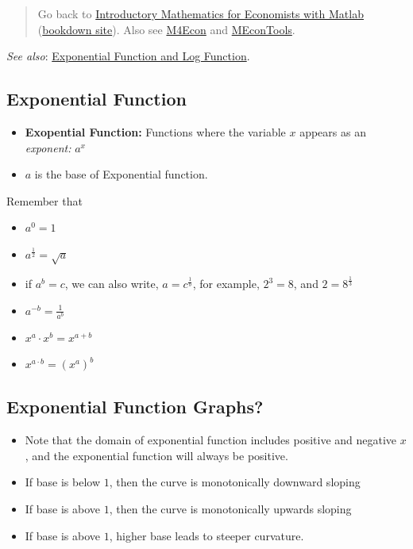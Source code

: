 \documentclass[
]{book}
\begin{document}
\begin{quote}
Go back to \href{https://math4econ.github.io/}{Introductory Mathematics for Economists with Matlab} (\href{https://math4econ.github.io/bookdown}{bookdown site}). Also see \href{http://fanwangecon.github.io/M4Econ}{M4Econ} and \href{https://fanwangecon.github.io/MEconTools/}{MEconTools}.
\end{quote}

\emph{See also}: \href{https://math4econ.github.io/explog/exolog.html}{Exponential Function and Log
Function}.

\hypertarget{exponential-function}{%
\subsection{\texorpdfstring{\textbf{Exponential Function}}{Exponential Function}}\label{exponential-function}}

\begin{itemize}
\item
  \textbf{Exopential Function:} Functions where the variable \(x\) appears as
  an \emph{exponent:} \(a^x\)
\item
  \(a\) is the base of Exponential function.
\end{itemize}

Remember that

\begin{itemize}
\item
  \(\displaystyle a^0 =1\)
\item
  \(\displaystyle a^{\frac{1}{2}} =\sqrt{a}\)
\item
  if \(a^b =c\), we can also write, \(a=c^{\frac{1}{b}}\), for example,
  \(2^3 =8\), and \(2=8^{\frac{1}{3}}\)
\item
  \(\displaystyle a^{-b} =\frac{1}{a^b }\)
\item
  \(\displaystyle x^a \cdot x^b =x^{a+b}\)
\item
  \(\displaystyle x^{a\cdot b} =(x^a )^b\)
\end{itemize}

\hypertarget{exponential-function-graphs}{%
\subsection{Exponential Function Graphs?}\label{exponential-function-graphs}}

\begin{itemize}
\item
  Note that the domain of exponential function includes positive and
  negative \(x\), and the exponential function will always be positive.
\item
  If base is below \(1\), then the curve is monotonically downward
  sloping
\item
  If base is above \(1\), then the curve is monotonically upwards
  sloping
\item
  If base is above \(1\), higher base leads to steeper curvature.
\end{itemize}
\end{document}
